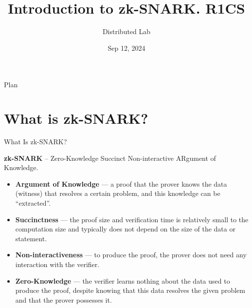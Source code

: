 \documentclass{beamer}
\title[zk-SNARK I]{\textbf{Introduction to zk-SNARK. R1CS}}
\author{Distributed Lab}
\date{Sep 12, 2024}
\begin{document}
    \frame {
        \titlepage
    }

    \begin{frame}{Plan}
        \tableofcontents
    \end{frame}

    \section{What is zk-SNARK?}

    \begin{frame}{What Is zk-SNARK?}
        \begin{definition}
            \textbf{zk-SNARK} – Zero-Knowledge Succinct Non-interactive ARgument of 
            Knowledge.
        \end{definition}

        \pause

        \begin{itemize}
            \item \textbf{Argument of Knowledge} --- a proof that the prover knows the data (witness) that resolves a certain
            problem, and this knowledge can be ``extracted''. \pause
            \item \textbf{Succinctness} --- the proof size and verification time is relatively small to the computation size and typically does not depend on the size of 
            the data or statement. \pause
            \item \textbf{Non-interactiveness} --- to produce the proof, the prover does not need any interaction
            with the verifier. \pause
            \item \textbf{Zero-Knowledge} --- the verifier learns nothing about the data used to produce the
            proof, despite knowing that this data resolves the given problem and that the prover possesses it.
        \end{itemize}
    \end{frame}
\end{document}
